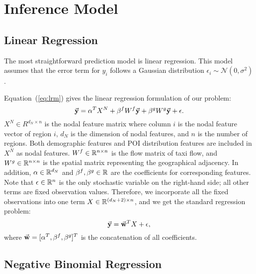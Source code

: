 
\section{Inference Model}
\label{sec:model}


\subsection{Linear Regression}


The most straightforward prediction model is linear regression. This model assumes that the error term for $y_i$ follows a Gaussian distribution $\epsilon_i \sim \mathcal{N}(0, \sigma^2)$.


Equation~(\ref{eq:lrm}) gives the linear regression formulation of our problem:
\begin{equation}
\label{eq:lrm}
\vec{\mathbf{y}} =  \alpha^T X^N + \beta^f W^f \vec{\mathbf{y}} + \beta^g W^g \vec{\mathbf{y}} + \epsilon.
\end{equation}
$X^N \in R^{d_N \times n}$ is the nodal feature matrix where column $i$ is the nodal feature vector of region $i$, $d_N$ is the dimension of nodal features, and $n$ is the number of regions. Both demographic features and POI distribution features are included in $X^N$ as nodal features. $W^f \in \mathbb{R}^{n \times n}$ is the flow matrix of taxi flow, and $W^g \in \mathbb{R}^{n \times n}$ is the spatial matrix representing the geographical adjacency. In addition, $\alpha \in \mathbb{R}^{d_N}$ and $\beta^f, \beta^g \in \mathbb{R}$ are the coefficients for corresponding features. Note that $\epsilon \in \mathbb{R}^n$ is the only stochastic variable on the right-hand side; all other terms are fixed observation values. Therefore, we incorporate all the fixed observations into one term $X \in \mathbb{R}^{(d_N + 2)\times n}$, and we get the standard regression problem:
\[
\vec{\mathbf{y}}= \vec{\mathbf{w}}^T X + \epsilon,
\]
where $\vec{\mathbf{w}} = [\alpha^T, \beta^f, \beta^g]^T$ is the concatenation of all coefficients.


\subsection{Negative Binomial Regression}


